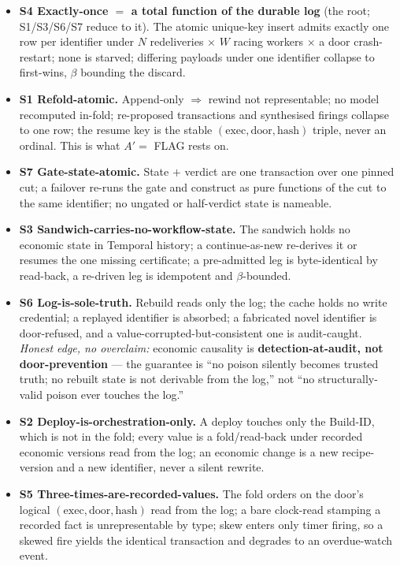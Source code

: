 \documentclass[11pt,a4paper]{article}
\begin{document}
\begin{itemize}[leftmargin=*, itemsep=0pt, topsep=1pt]
\item \textbf{S4 Exactly-once $=$ a total function of the durable log} (the root; S1/S3/S6/S7 reduce to it).
The atomic unique-key insert admits exactly one row per identifier under $N$ redeliveries $\times$ $W$
racing workers $\times$ a door crash-restart; none is starved; differing payloads under one identifier
collapse to first-wins, $\beta$ bounding the discard.
\item \textbf{S1 Refold-atomic.} Append-only $\Rightarrow$ rewind not representable; no model recomputed
in-fold; re-proposed transactions and synthesised firings collapse to one row; the resume key is the stable
$(\text{exec},\text{door},\text{hash})$ triple, never an ordinal. This is what $A'=$ FLAG rests on.
\item \textbf{S7 Gate-state-atomic.} State $+$ verdict are one transaction over one pinned cut; a failover
re-runs the gate and construct as pure functions of the cut to the same identifier; no ungated or
half-verdict state is nameable.
\item \textbf{S3 Sandwich-carries-no-workflow-state.} The sandwich holds no economic state in Temporal
history; a continue-as-new re-derives it or resumes the one missing certificate; a pre-admitted leg is
byte-identical by read-back, a re-driven leg is idempotent and $\beta$-bounded.
\item \textbf{S6 Log-is-sole-truth.} Rebuild reads only the log; the cache holds no write credential; a
replayed identifier is absorbed; a fabricated novel identifier is door-refused, and a
value-corrupted-but-consistent one is audit-caught. \emph{Honest edge, no overclaim:} economic causality is
\textbf{detection-at-audit, not door-prevention} --- the guarantee is ``no poison silently becomes trusted
truth; no rebuilt state is not derivable from the log,'' not ``no structurally-valid poison ever touches
the log.''
\item \textbf{S2 Deploy-is-orchestration-only.} A deploy touches only the Build-ID, which is not in the
fold; every value is a fold/read-back under recorded economic versions read from the log; an economic change
is a new recipe-version and a new identifier, never a silent rewrite.
\item \textbf{S5 Three-times-are-recorded-values.} The fold orders on the door's logical
$(\text{exec},\text{door},\text{hash})$ read from the log; a bare clock-read stamping a recorded fact is
unrepresentable by type; skew enters only timer firing, so a skewed fire yields the identical transaction
and degrades to an overdue-watch event.
\end{itemize}
\end{document}
